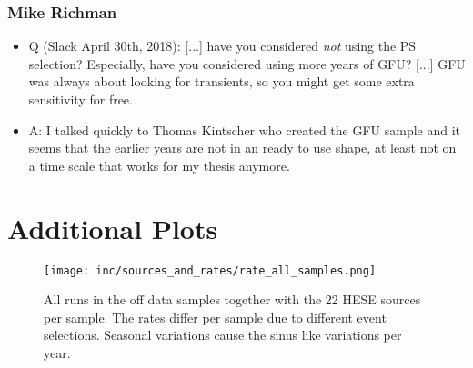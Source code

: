 \subsubsection*{Mike Richman}
  \begin{itemize}
      \item Q (Slack April 30th, 2018):
        [...] have you considered \emph{not} using the PS selection? Especially, have you considered using more years of GFU?
        [...] GFU was always about looking for transients, so you might get some extra sensitivity for free.
      \item A:
        I talked quickly to Thomas Kintscher who created the GFU sample and it seems that the earlier years are not in an ready to use shape, at least not on a time scale that works for my thesis anymore.
  \end{itemize}



\section{Additional Plots}

\begin{figure}[h]
  \centering
  \texttt{[image: inc/sources\_and\_rates/rate\_all\_samples.png]}
  \caption{All runs in the off data samples together with the 22 HESE sources per sample. The rates differ per sample due to different event selections. Seasonal variations cause the sinus like variations per year.}
  \label{fig:rate_all_samples}
\end{figure}


